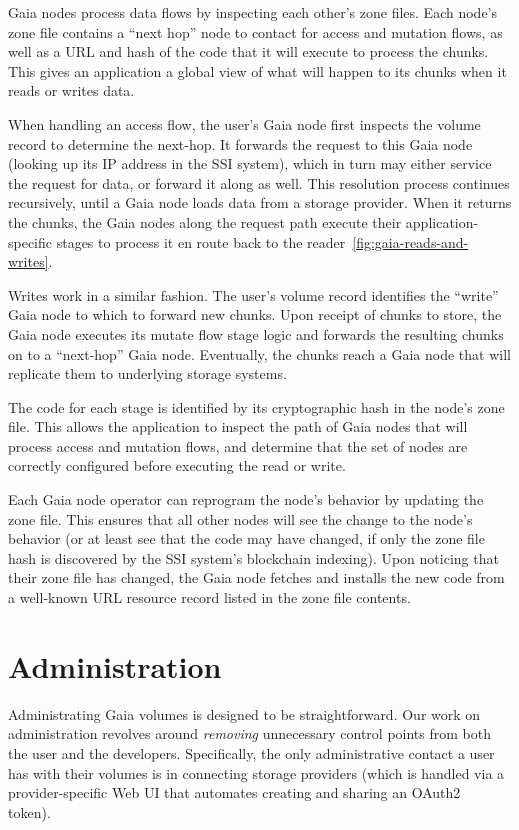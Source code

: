 Gaia nodes process data flows by inspecting each other's zone files.
Each node's zone file contains a ``next hop'' node to contact for access and
mutation flows, as well as a URL and hash of the code that it will execute to process
the chunks.  This gives an application a global view of what will happen to its
chunks when it reads or writes data.


When handling an access flow, the user's Gaia node first inspects the volume
record to determine the next-hop.  It
forwards the request to this Gaia node (looking up its IP address in the SSI
system), which in turn may either service the request for data, or forward it
along as well.  This resolution process continues recursively, until a Gaia node
loads data from a storage provider.  When it returns the chunks, the Gaia nodes
along the request path execute their application-specific stages to process it
en route back to the reader~\ref{fig:gaia-reads-and-writes}.

Writes work in a similar fashion.  The user's volume record identifies the
``write'' Gaia node to which to forward new chunks.  Upon receipt of chunks to
store, the Gaia node executes its mutate flow stage logic and forwards the
resulting chunks on to a ``next-hop'' Gaia node.  Eventually, the chunks reach a Gaia
node that will replicate them to underlying storage systems.

The code for each stage is identified by its cryptographic hash in the node's
zone file.  This allows the application to inspect the path of Gaia nodes that
will process access and mutation flows, and determine that the set of nodes are
correctly configured before executing the read or write.

Each Gaia node operator can reprogram the node's behavior by updating the zone file.
This ensures that all other nodes will see the change to the node's behavior (or
at least see that the code may have changed, if only the zone file hash is
discovered by the SSI system's blockchain indexing).  Upon noticing that their
zone file has changed, the Gaia node fetches and installs the new code from a
well-known URL resource record listed in the zone file contents.

\section{Administration}

Administrating Gaia volumes is designed to be straightforward.  Our work on
administration revolves around \emph{removing} unnecessary control points from 
both the user and the developers.
Specifically, the only administrative contact a user has with their volumes is
in connecting storage providers (which is handled via a provider-specific Web UI
that automates creating and sharing an OAuth2~\cite{oauth2} token).

